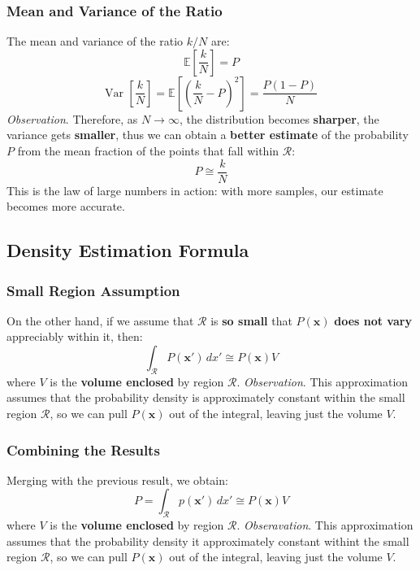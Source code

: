 \documentclass[a4paper]{article}
\theoremstyle{definition}
\begin{document}
\subsubsection{Mean and Variance of the Ratio}
The mean and variance of the ratio \( k/N \) are:
\[
  \mathbb{E} [\frac{k}{N}] = P
\]
\[
  \text{Var } [\frac{k}{N}] = \mathbb{E} [(\frac{k}{N} - P)^2] = \frac{P(1 - P)}{N} 
\]
\textit{Observation}. Therefore, as \( N \rightarrow \infty \), the distribution becomes \textbf{sharper}, the variance gets \textbf{smaller},
thus we can obtain a \textbf{better estimate} of the probability \( P \) from the mean fraction of the points that fall within \( \mathcal{R} \):
\[
  P \cong \frac{k}{N}
\]
This is the law of large numbers in action: with more samples, our estimate becomes more accurate.
\subsection{Density Estimation Formula}
\subsubsection{Small Region Assumption}
On the other hand, if we assume that \( \mathcal{R} \) is \textbf{so small} that \( P(\mathbf{x}) \) \textbf{does not vary} appreciably within it, then:
\[
  \int_{\mathcal{R}} P(\mathbf{x}')\,dx' \cong P(\mathbf{x})V
\]
where \( V \) is the \textbf{volume enclosed} by region \( \mathcal{R} \).
\vspace{1em}
\noindent
\newline
\textit{Observation}. This approximation assumes that the probability density is approximately constant within the small region \( \mathcal{R} \), so 
we can pull \( P(\mathbf{x}) \) out of the integral, leaving just the volume \( V \).
\subsubsection{Combining the Results}
Merging with the previous result, we obtain:
\[
  P = \int_{\mathcal{R}} p(\mathbf{x}')\,dx' \cong P(\mathbf{x}) V
\]
where \( V \) is the \textbf{volume enclosed} by region \( \mathcal{R} \).
\vspace{1em}
\noindent
\newline
\textit{Obseravation}. This approximation assumes that the probability density it approximately constant withint the small region \( \mathcal{R} \), so we can pull \( P(\mathbf{x}) \) out of the integral,
leaving just the volume \( V \).
\end{document}
